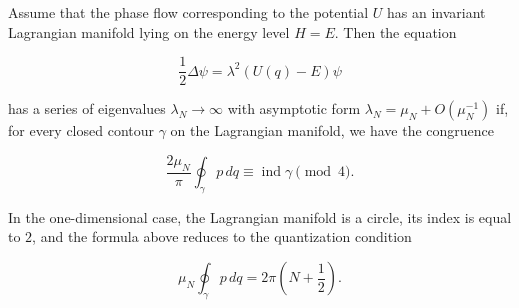 Assume that the phase flow corresponding to the potential $U$ has an invariant Lagrangian manifold lying on the energy level $H = E$. Then the equation

$$\frac{1}{2} \Delta \psi = \lambda^2 (U(q) - E) \psi$$

has a series of eigenvalues $\lambda_N \rightarrow \infty$ with asymptotic form $\lambda_N = \mu_N + O(\mu_N^{-1})$ if, for every closed contour $\gamma$ on the Lagrangian manifold, we have the congruence

$$\frac{2 \mu_N}{\pi} \oint_{\gamma} p \, dq \equiv \operatorname{ind} \gamma \pmod{4}.$$

In the one-dimensional case, the Lagrangian manifold is a circle, its index is equal to $2$, and the formula above reduces to the quantization condition

$$\mu_N \oint_{\gamma} p \, dq = 2\pi\left(N + \frac{1}{2}\right).$$
